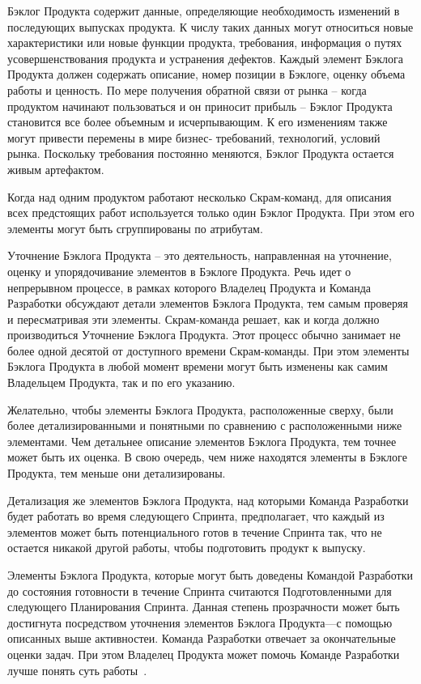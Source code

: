 \documentclass{../industrial-development}
\begin{document}
\lecturenotes
Бэклог Продукта содержит данные, определяющие необходимость изменений в
последующих выпусках продукта. К числу таких данных могут относиться новые
характеристики или новые функции продукта, требования, информация о путях
усовершенствования продукта и устранения дефектов. Каждый элемент Бэклога Продукта
должен содержать описание, номер позиции в Бэклоге, оценку объема работы и ценность.
По мере получения обратной связи от рынка – когда продуктом начинают пользоваться и
он приносит прибыль – Бэклог Продукта становится все более объемным и
исчерпывающим. К его изменениям также могут привести перемены в мире бизнес‐
требований, технологий, условий рынка. Поскольку требования постоянно меняются,
Бэклог Продукта остается живым артефактом.

Когда над одним продуктом работают несколько Скрам‐команд, для описания всех
предстоящих работ используется только один Бэклог Продукта. При этом его элементы
могут быть сгруппированы по атрибутам.

Уточнение Бэклога Продукта – это деятельность, направленная на уточнение,
оценку и упорядочивание элементов в Бэклоге Продукта. Речь идет о непрерывном
процессе, в рамках которого Владелец Продукта и Команда Разработки обсуждают детали элементов Бэклога Продукта, тем самым проверяя и пересматривая эти элементы. Скрам‐команда решает, как и когда должно производиться Уточнение Бэклога Продукта. Этот
процесс обычно занимает не более одной десятой от доступного времени Скрам‐команды. При этом
элементы Бэклога Продукта в любой момент времени могут быть изменены как самим
Владельцем Продукта, так и по его указанию.

Желательно, чтобы элементы Бэклога Продукта, расположенные сверху, были более
детализированными и понятными по сравнению с расположенными ниже элементами.
Чем детальнее описание элементов Бэклога Продукта, тем точнее может быть их оценка. В
свою очередь, чем ниже находятся элементы в Бэклоге Продукта, тем меньше они
детализированы.

Детализация же элементов Бэклога Продукта, над которыми Команда Разработки будет
работать во время следующего Спринта, предполагает, что каждый из элементов может
быть потенциального готов в течение Спринта так, что не остается никакой другой работы,
чтобы подготовить продукт к выпуску.

Элементы Бэклога Продукта, которые могут быть доведены Командой Разработки до
состояния готовности в течение Спринта считаются Подготовленными для следующего
Планирования Спринта. Данная степень прозрачности может быть достигнута посредством
уточнения элементов Бэклога Продукта---с помощью описанных выше активностеи.
Команда Разработки отвечает за окончательные оценки задач. При этом Владелец
Продукта может помочь Команде Разработки лучше понять суть работы~\cite{Scrum}.
\end{document}

